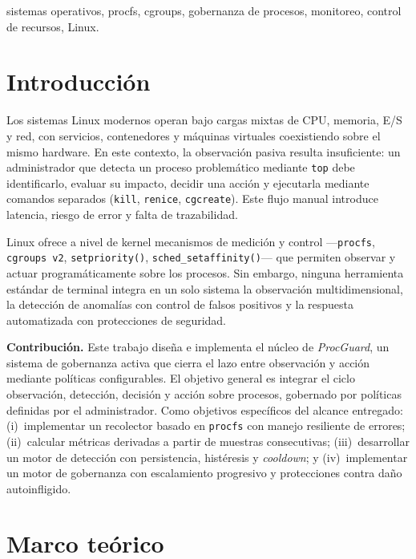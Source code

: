 \documentclass[conference]{IEEEtran}
\begin{document}
\begin{IEEEkeywords}
sistemas operativos, procfs, cgroups, gobernanza de procesos, monitoreo,
control de recursos, Linux.
\end{IEEEkeywords}

\section{Introducción}

Los sistemas Linux modernos operan bajo cargas mixtas de CPU, memoria, E/S y red,
con servicios, contenedores y máquinas virtuales coexistiendo sobre el mismo
hardware. En este contexto, la observación pasiva resulta insuficiente: un
administrador que detecta un proceso problemático mediante \texttt{top} debe
identificarlo, evaluar su impacto, decidir una acción y ejecutarla mediante
comandos separados (\texttt{kill}, \texttt{renice}, \texttt{cgcreate}). Este
flujo manual introduce latencia, riesgo de error y falta de trazabilidad.

Linux ofrece a nivel de kernel mecanismos de medición y control
---\texttt{procfs}, \texttt{cgroups~v2}, \texttt{setpriority()},
\texttt{sched\_setaffinity()}--- que permiten observar y actuar
programáticamente sobre los procesos. Sin embargo, ninguna herramienta estándar
de terminal integra en un solo sistema la observación multidimensional, la
detección de anomalías con control de falsos positivos y la respuesta
automatizada con protecciones de seguridad.

\textbf{Contribución.} Este trabajo diseña e implementa el núcleo de
\emph{ProcGuard}, un sistema de gobernanza activa que cierra el lazo entre
observación y acción mediante políticas configurables. El objetivo general es
integrar el ciclo observación, detección, decisión y acción sobre procesos,
gobernado por políticas definidas por el administrador. Como objetivos
específicos del alcance entregado: (i)~implementar un recolector basado en
\texttt{procfs} con manejo resiliente de errores; (ii)~calcular métricas
derivadas a partir de muestras consecutivas; (iii)~desarrollar un motor de
detección con persistencia, histéresis y \emph{cooldown}; y (iv)~implementar un
motor de gobernanza con escalamiento progresivo y protecciones contra daño
autoinfligido.

\section{Marco teórico}
\end{document}

